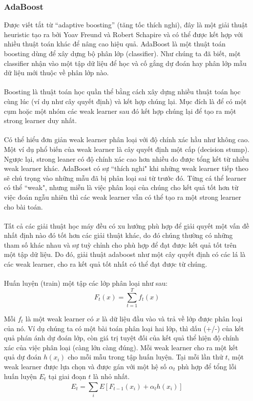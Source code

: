 \documentclass[12pt,a4paper]{article}
\newcounter{subsubsubsection}[subsubsection]
\begin{document}
\subsubsection{AdaBoost \cite{AdaBoost}}


Được viết tắt từ “adaptive boosting” (tăng tốc thích nghi), đây là một giải thuật heuristic  tạo ra bởi Yoav Freund và Robert Schapire và có thể được kết hợp với nhiều thuật toán khác để nâng cao hiệu quả. AdaBoost là một thuật toán boosting dùng để xây dựng bộ phân lớp (classifier). Như chúng ta đã biết, một classifier nhận vào một tập dữ liệu để học và cố gắng dự đoán hay phân lớp mẫu dữ liệu mới thuộc về phân lớp nào. \\ \\
Boosting là thuật toán học quần thể bằng cách xây dựng nhiều thuật toán học cùng lúc (ví dụ như cây quyết định) và kết hợp chúng lại. Mục đích là để có một cụm hoặc một nhóm các weak learner sau đó kết hợp chúng lại để tạo ra một strong learner duy nhất. \\ \\
Có thể hiểu đơn giản weak learner phân loại với độ chính xác hầu như không cao. Một ví dụ phổ biến của weak learner là cây quyết định một cấp (decision stump). Ngược lại, strong leaner có độ chính xác cao hơn nhiều do được tổng kết từ nhiều weak learner khác. AdaBoost có sự “thích nghi" khi những weak learner tiếp theo sẽ chú trọng vào những mẫu đã bị phân loại sai từ trước đó. Từng cá thể learner có thể “weak", nhưng miễn là việc phân loại của chúng cho kết quả tốt hơn từ việc đoán ngẫu nhiên thì các weak learner vẫn có thể tạo ra một strong learner cho bài toán. \\ \\
Tất cả các giải thuật học máy đều có xu hướng phù hợp để giải quyết một vấn đề nhất định nào đó tốt hơn các giải thuật khác, do đó chúng thường có những tham số khác nhau và sự tuỳ chỉnh cho phù hợp để đạt được kết quả tốt trên một tập dữ liệu. Do đó, giải thuật adaboost như một cây quyết định có các lá là các weak learner, cho ra kết quả tốt nhất có thể đạt được từ chúng. \\ \\
Huấn luyện (train) một tập các lớp phân loại như sau:
\begin{equation}
    F_{t}(x) = \sum_{t=1}^{T}f_{t}(x)
\end{equation}

Mỗi $f_t$ là một weak learner có $x$ là dữ liệu đầu vào và trả về lớp được phân loại của nó. Ví dụ chúng ta có một bài toán phân loại hai lớp, thì dấu (+/-) của kết quả phán ánh dự đoán lớp, còn giá trị tuyệt đối của kết quả thể hiện độ chính xác của việc phân loại (càng lớn càng đúng). Mỗi weak learner cho ra một kết quả dự đoán $h(x_{i})$ cho mỗi mẫu trong tập huấn luyện. Tại mỗi lần thử $t$, một weak learner được lựa chọn và được gán với một  hệ số $\alpha_{t}$  phù hợp để tổng lỗi huấn luyện $E_t$ tại giai đoạn $t$ là nhỏ nhất.
\begin{equation}
    E_t = \sum_{i}^{}E[F_{t-1}(x_i) + \alpha_th(x_i)]
\end{equation}
\end{document}
